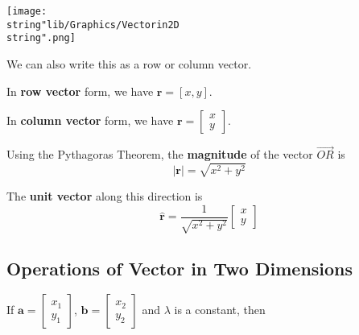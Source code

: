\documentclass[11pt,a4paper]{book}
\begin{document}
\begin{minipage}[t]{0.45\textwidth}
\begin{center}
\texttt{[image: \\string"lib/Graphics/Vectorin2D\\string".png]}
\par\end{center}

\end{minipage}
\begin{minipage}[t]{0.6\textwidth}

\begin{tcolorbox}[colback=blue!5, colframe=black, boxrule=.4pt, sharpish corners]

We can also write this as a row or column vector.

\medskip{}

In \textbf{row vector} form, we have $\textbf{r}=\left[x,y\right]$.

In \textbf{column vector} form, we have $\textbf{r}=\begin{bmatrix}x\\
y
\end{bmatrix}$.

Using the Pythagoras Theorem, the \textbf{magnitude} of the vector
$\overrightarrow{OR}$ is
\[
\left|\textbf{r}\right|=\sqrt{x^{2}+y^{2}}
\]

The \textbf{unit vector} along this direction is
\[
\hat{\textbf{r}}=\frac{1}{\sqrt{x^{2}+y^{2}}}\begin{bmatrix}x\\
y
\end{bmatrix}
\]
\end{tcolorbox}

\end{minipage}

\subsection{Operations of Vector in Two Dimensions}

If $\textbf{a}=\begin{bmatrix}x_{1}\\
y_{1}
\end{bmatrix}$, $\textbf{b}=\begin{bmatrix}x_{2}\\
y_{2}
\end{bmatrix}$ and $\lambda$ is a constant, then
\end{document}
